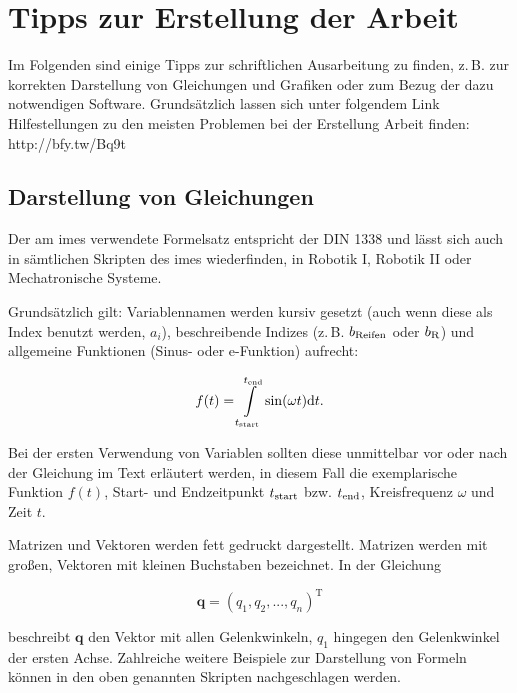 \chapter{Tipps zur Erstellung der Arbeit}
Im Folgenden sind einige Tipps zur schriftlichen Ausarbeitung zu finden, z.\,B. zur korrekten Darstellung von Gleichungen und Grafiken oder zum Bezug der dazu notwendigen Software. Grundsätzlich lassen sich unter folgendem Link Hilfestellungen zu den meisten Problemen bei der Erstellung Arbeit finden: http://bfy.tw/Bq9t


\section{Darstellung von Gleichungen}
\label{sec.Gleichungen}
Der am imes verwendete Formelsatz entspricht der DIN 1338 und lässt sich auch in sämtlichen Skripten des imes wiederfinden, \zB in Robotik I, Robotik II oder Mechatronische Systeme.

Grundsätzlich gilt: Variablennamen werden kursiv gesetzt (auch wenn diese als Index benutzt werden, \zB $a_i$), beschreibende Indizes (z.\,B. $b_{\mathrm{Reifen}}$ oder $b_{\mathrm{R}}$) und allgemeine Funktionen (\zB Sinus- oder e-Funktion) aufrecht:

\begin{equation}
\label{eq:bsp_1}
	f(t) = \int\limits_{t_{\mathrm{start}}}^{t_{\mathrm{end}}} \sin(\omega t) {\mathrm{d}}t.
\end{equation}

Bei der ersten Verwendung von Variablen sollten diese unmittelbar vor oder nach der Gleichung im Text erläutert werden, in diesem Fall die exemplarische Funktion $f(t)$, Start- und Endzeitpunkt $t_{\mathrm{start}}$ bzw. $t_{\mathrm{end}}$, Kreisfrequenz $\omega$ und Zeit $t$. 


Matrizen und Vektoren werden fett gedruckt dargestellt. Matrizen werden mit großen, Vektoren mit kleinen Buchstaben bezeichnet. In der Gleichung

\begin{equation}
\label{eq:bsp_2}
	\boldsymbol{q} = (q_1, q_2, ..., q_n)^\mathrm{T}
\end{equation}

beschreibt $\boldsymbol{q}$ den Vektor mit allen Gelenkwinkeln, $q_1$ hingegen den Gelenkwinkel der ersten Achse. Zahlreiche weitere Beispiele zur Darstellung von Formeln können in den oben genannten Skripten nachgeschlagen werden.

